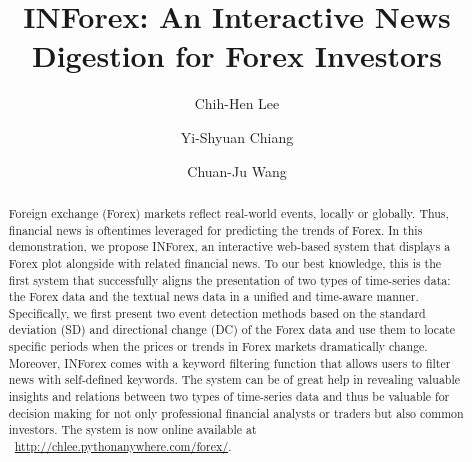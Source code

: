 \documentclass[sigconf]{acmart}
\begin{document}
\title{INForex: An Interactive News Digestion for Forex Investors}


\author{Chih-Hen Lee}

\author{Yi-Shyuan Chiang}
\authornotemark[1]

\author{Chuan-Ju Wang}


\renewcommand{\shortauthors}{Lee, Chiang and Wang}

\begin{abstract}
Foreign exchange (Forex) markets reflect real-world events, locally or globally.
Thus,  financial news is oftentimes leveraged for predicting the trends of Forex.
In this demonstration, we propose INForex, an interactive web-based system that displays a Forex plot alongside with related financial news.
To our best knowledge, this is the first system that successfully aligns the presentation of two types of time-series data: the Forex data and the textual news data in a unified and time-aware manner. 
Specifically, we first present two event detection methods based on the standard deviation (SD) and directional change (DC) of the Forex data and use them to locate specific periods when the prices or trends in Forex markets dramatically change.
Moreover, INForex comes with a keyword filtering function that allows users to filter news with self-defined keywords.
The system can be of great help in revealing valuable insights and relations between two types of time-series data and thus be valuable for decision making for not only professional financial analysts or traders but also common investors.
The system is now online available at ~\url{http://chlee.pythonanywhere.com/forex/}.
\end{abstract}
\end{document}
